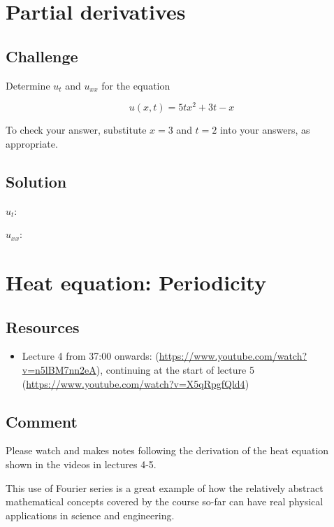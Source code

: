 \newpage
\section{Partial derivatives}

\subsection*{Challenge}
Determine $u_t$ and $u_{xx}$ for the equation

\begin{equation}
    u(x,t) = 5tx^2 + 3t - x
\end{equation}

To check your answer, substitute $x=3$ and $t=2$ into your answers, as appropriate.

\subsection*{Solution}
$u_t$: 

$u_{xx}$: 




\newpage
\section{Heat equation: Periodicity}

\subsection*{Resources}
\begin{itemize}
    \item Lecture 4 from 37:00 onwards: (\url{https://www.youtube.com/watch?v=n5lBM7nn2eA}), continuing at the start of lecture 5 (\url{https://www.youtube.com/watch?v=X5qRpgfQld4})
\end{itemize}

\subsection*{Comment}
Please watch and makes notes following the derivation of the heat equation shown in the videos in lectures 4-5.

This use of Fourier series is a great example of how the relatively abstract mathematical concepts covered by the course so-far can have real physical applications in science and engineering.

